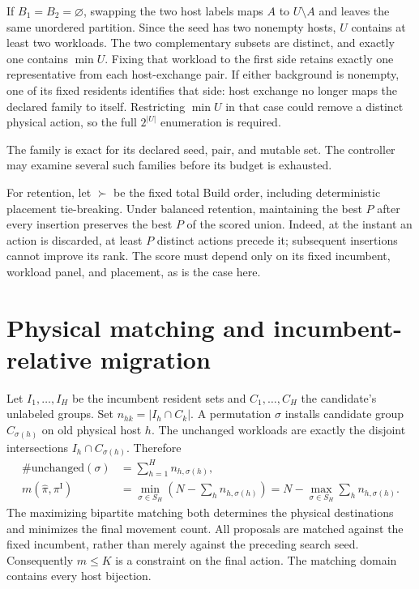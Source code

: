 \documentclass[11pt]{article}
\newcommand{\inc}{\pi^{\mathrm I}}
\newcommand{\act}{\widehat\pi}
\begin{document}
If $B_1=B_2=\varnothing$, swapping the two host labels maps $A$ to $U\setminus A$ and leaves the same unordered partition. Since the seed has two nonempty hosts, $U$ contains at least two workloads. The two complementary subsets are distinct, and exactly one contains $\min U$. Fixing that workload to the first side retains exactly one representative from each host-exchange pair. If either background is nonempty, one of its fixed residents identifies that side: host exchange no longer maps the declared family to itself. Restricting $\min U$ in that case could remove a distinct physical action, so the full $2^{|U|}$ enumeration is required.

The family is exact for its declared seed, pair, and mutable set. The controller may examine several such families before its budget is exhausted.

For retention, let $\succ$ be the fixed total Build order, including deterministic placement tie-breaking. Under balanced retention, maintaining the best $P$ after every insertion preserves the best $P$ of the scored union. Indeed, at the instant an action is discarded, at least $P$ distinct actions precede it; subsequent insertions cannot improve its rank. The score must depend only on its fixed incumbent, workload panel, and placement, as is the case here.

\section{Physical matching and incumbent-relative migration}
Let $I_1,\ldots,I_H$ be the incumbent resident sets and $C_1,\ldots,C_H$ the candidate's unlabeled groups. Set $n_{hk}=|I_h\cap C_k|$. A permutation $\sigma$ installs candidate group $C_{\sigma(h)}$ on old physical host $h$. The unchanged workloads are exactly the disjoint intersections $I_h\cap C_{\sigma(h)}$. Therefore
\begin{align}
 \#\mathrm{unchanged}(\sigma)&=\sum_{h=1}^Hn_{h,\sigma(h)},\\
 m(\act,\inc)&=\min_{\sigma\in S_H}\left(N-\sum_hn_{h,\sigma(h)}\right)
 =N-\max_{\sigma\in S_H}\sum_hn_{h,\sigma(h)}.
 \label{eq:matching}
\end{align}
The maximizing bipartite matching both determines the physical destinations and minimizes the final movement count. All proposals are matched against the fixed incumbent, rather than merely against the preceding search seed. Consequently $m\le K$ is a constraint on the final action. The matching domain contains every host bijection.
\end{document}
